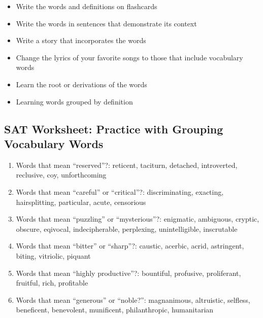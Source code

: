 \begin{enumerate}
\begin{itemize}

\item Write the words and definitions on flashcards

\item Write the words in sentences that demonstrate its context

\item Write a story that incorporates the words 

\item Change the lyrics of your favorite songs to those that include vocabulary words

\item Learn the root or derivations of the words

\item Learning words grouped by definition

\end{itemize}

\subsection{SAT Worksheet: Practice with Grouping Vocabulary Words}

\begin{enumerate}

\item Words that mean ``reserved''?: reticent, taciturn, detached, introverted, reclusive, coy, unforthcoming

\item Words that mean ``careful'' or ``critical''?: discriminating, exacting, hairsplitting, particular, acute, censorious

\item Words that mean ``puzzling'' or ``mysterious''?: enigmatic, ambiguous, cryptic, obscure, eqivocal, indecipherable, perplexing, unintelligible, inscrutable

\item Words that mean ``bitter'' or ``sharp''?: caustic, acerbic, acrid, astringent, biting, vitriolic, piquant

\item Words that mean ``highly productive''?: bountiful, profusive, proliferant, fruitful, rich, profitable

\item Words that mean ``generous'' or ``noble?'': magnanimous, altruistic, selfless, beneficent, benevolent, munificent, philanthropic, humanitarian


\end{enumerate}
\end{enumerate}
